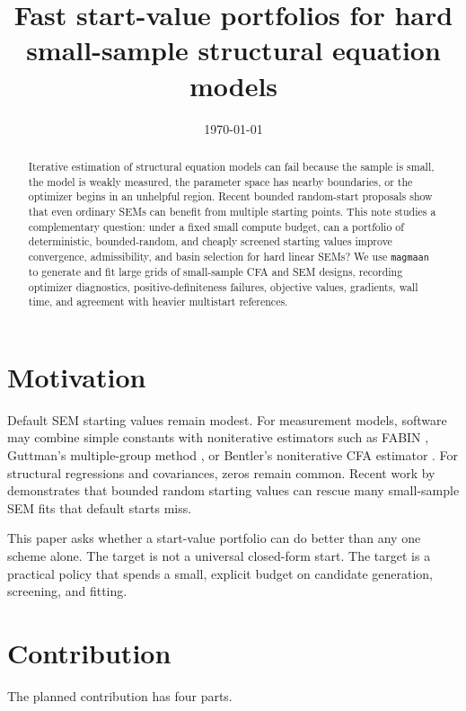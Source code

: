 \documentclass[11pt]{article}
\title{Fast start-value portfolios for hard small-sample structural equation models}
\author{ }
\date{\today}
\newcommand{\magmaan}{\texttt{magmaan}}
\begin{document}
\maketitle

\begin{abstract}
Iterative estimation of structural equation models can fail because the sample
is small, the model is weakly measured, the parameter space has nearby
boundaries, or the optimizer begins in an unhelpful region. Recent bounded
random-start proposals show that even ordinary SEMs can benefit from multiple
starting points. This note studies a complementary question: under a fixed
small compute budget, can a portfolio of deterministic, bounded-random, and
cheaply screened starting values improve convergence, admissibility, and basin
selection for hard linear SEMs? We use \magmaan{} to generate and fit large
grids of small-sample CFA and SEM designs, recording optimizer diagnostics,
positive-definiteness failures, objective values, gradients, wall time, and
agreement with heavier multistart references.
\end{abstract}

\section{Motivation}

Default SEM starting values remain modest. For measurement models, software may
combine simple constants with noniterative estimators such as FABIN
\citep{haggund1982fabin}, Guttman's multiple-group method
\citep{guttman1952multiple}, or Bentler's noniterative CFA estimator
\citep{bentler1982noniterative}. For structural regressions and covariances,
zeros remain common. Recent work by \citet{dejonckere2025randomstarts}
demonstrates that bounded random starting values can rescue many small-sample
SEM fits that default starts miss.

This paper asks whether a start-value portfolio can do better than any one
scheme alone. The target is not a universal closed-form start. The target is a
practical policy that spends a small, explicit budget on candidate generation,
screening, and fitting.

\section{Contribution}

The planned contribution has four parts.
\end{document}
